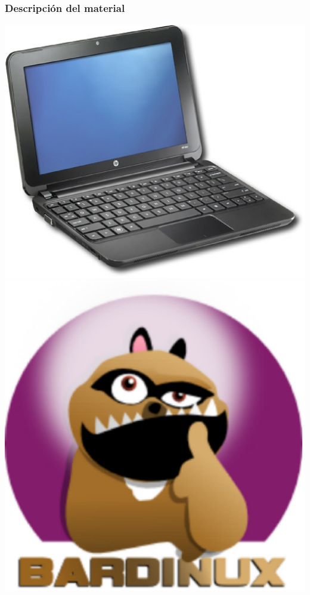 \documentclass{beamer}
\begin{document}
\begin{frame}
\frametitle{Descripción del material}
\includegraphics[scale=0.25]{img/portatil.eps}
\includegraphics[scale=0.15]{img/bardinux.eps}

\end{frame}
\end{document}
